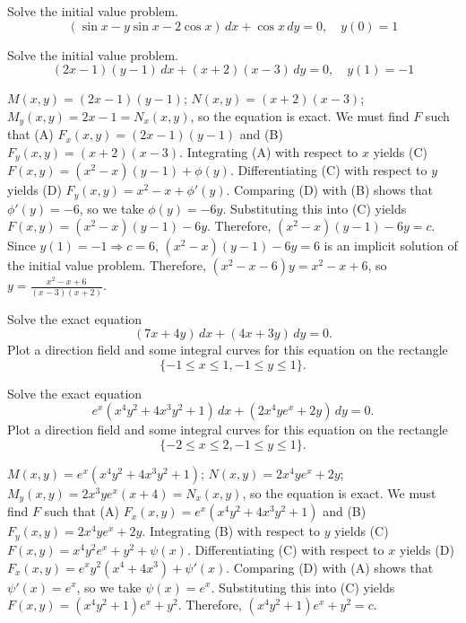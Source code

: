 \documentclass{ximera}
\begin{document}
\begin{problem}\label{exer:2.5.21} Solve the initial value problem.
$$(\sin x-y\sin x-2\cos x)\,dx+\cos x\,dy=0,\quad y(0)=1$$
\end{problem}

\begin{problem}\label{exer:2.5.22} Solve the initial value problem.
$$(2x-1)(y-1)\,dx+(x+2)(x-3)\,dy=0,\quad y(1)=-1$$



\begin{solution}
    $M(x,y)=(2x-1)(y-1)$;\;
$N(x,y)=(x+2)(x-3)$;\;
$M_y(x,y)=2x-1=N_x(x,y)$,
so the  equation is exact.
We must find $F$ such that
(A) $F_x(x,y)=(2x-1)(y-1)$ and
(B) $F_y(x,y)=(x+2)(x-3)$.
Integrating (A) with respect to $x$ yields
(C) $F(x,y)=(x^2-x)(y-1)+\phi(y)$.
Differentiating (C) with respect to $y$  yields
(D) $F_y(x,y)=x^2-x+\phi'(y)$.
Comparing (D) with (B)  shows that
$\phi'(y)=-6$, so we take
$\phi(y)=-6y$.
Substituting this into (C) yields
$F(x,y)=(x^2-x)(y-1)-6y$.
Therefore, $(x^2-x)(y-1)-6y=c$.
Since $y(1)=-1\Rightarrow c=6$,
$(x^2-x)(y-1)-6y=6$ is an implicit solution of  the initial value
problem. Therefore, $(x^2-x-6)y=x^2-x+6$, so
$y=\frac{x^2-x+6}{(x-3)(x+2)}$.
\end{solution}
\end{problem}

\begin{problem}\label{exer:2.5.23}
Solve the exact equation
$$
(7x+4y)\,dx+(4x+3y)\,dy=0.
$$
Plot a direction field and some integral curves for this equation on
the rectangle
$$
\{-1\leq x\leq 1,-1\leq y\leq 1\}.
$$
\end{problem}

\begin{problem}\label{exer:2.5.24}
Solve the exact equation
$$
e^x(x^4y^2+4x^3y^2+1)\,dx+(2x^4ye^x+2y)\,dy=0.
$$
Plot a direction field and some integral curves for this equation on
the rectangle
$$
\{-2\leq x\leq 2,-1\leq y\leq 1\}.
$$



\begin{solution}
    $M(x,y)=e^x(x^4y^2+4x^3y^2+1)$;\;
$N(x,y)=2x^4ye^x+2y$;\;
$M_y(x,y)=2x^3ye^x(x+4)=N_x(x,y)$,
so the  equation is  exact.
We must find $F$ such that
(A) $F_x(x,y)=e^x(x^4y^2+4x^3y^2+1)$ and
(B) $F_y(x,y)=2x^4ye^x+2y$.
Integrating (B) with respect to $y$ yields
(C) $F(x,y)=x^4y^2e^x+y^2+\psi(x)$.
Differentiating (C) with respect to $x$  yields
(D) $F_x(x,y)=e^xy^2(x^4+4x^3)+\psi'(x)$.
Comparing (D) with (A)  shows that
$\psi'(x)=e^x$, so we take
$\psi(x)=e^x$.
Substituting this into (C) yields
$F(x,y)=(x^4y^2+1)e^x+y^2$.
Therefore, $(x^4y^2+1)e^x+y^2=c$.
\end{solution}
\end{problem}
\end{document}
